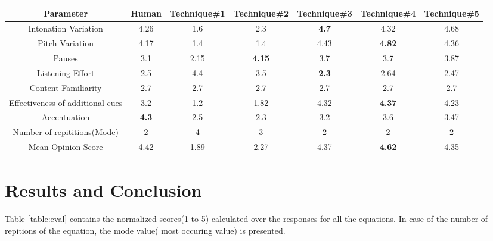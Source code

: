 \documentclass{article}
\begin{document}
\begin{table*}[t]
\centering
\caption{Evaluation of the proposed systems}

\vspace{8pt} %

\begin{tabularx}{\textwidth}{|c |c |c |c |c |c |c |}
\hline%
Parameter & Human & Technique\#1 & Technique\#2 & Technique\#3 & Technique\#4 & Technique\#5 \\[0.5ex]
\hline
Intonation Variation & 4.26 & 1.6 & 2.3 & \textbf{4.7} & 4.32 & 4.68 \\
\hline
Pitch  Variation& 4.17 & 1.4 & 1.4 & 4.43 & \textbf{4.82} & 4.36\\
\hline
Pauses & 3.1 & 2.15 & \textbf{4.15} & 3.7 & 3.7 & 3.87 \\
\hline
Listening Effort & 2.5 & 4.4 & 3.5 & \textbf{2.3} & 2.64 & 2.47\\
\hline
Content Familiarity &2.7 &2.7 &2.7 &2.7 &2.7 &2.7\\
\hline
Effectiveness of additional cues &3.2 &1.2 &1.82 & 4.32 & \textbf{4.37} & 4.23\\
\hline
Accentuation &\textbf{4.3} &2.5 & 2.3 & 3.2 & 3.6 & 3.47\\
\hline
Number of repititions(Mode) &2 & 4 & 3 & 2 & 2 & 2\\
\hline
Mean Opinion Score & 4.42 & 1.89 & 2.27 & 4.37 & \textbf{4.62} & 4.35\\ %
\hline


\end{tabularx}
\label{table:eval}
\end{table*}



\section{Results and Conclusion}
\label{sec:results}

Table \ref{table:eval} contains the normalized scores(1 to 5) calculated over the responses for all the equations. In case of the number of repitions of the equation, the  mode value( most occuring value) is presented.
\end{document}
